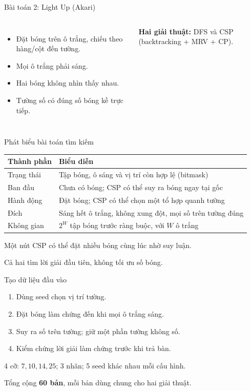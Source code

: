 \begin{frame}{Bài toán 2: Light Up (Akari)}
\begin{columns}[c,onlytextwidth]
\centering
{}\begin{itemize}
\item Đặt bóng trên ô trắng, chiếu theo hàng/cột đến tường.
\item Mọi ô trắng phải sáng.
\item Hai bóng không nhìn thấy nhau.
\item Tường số có đúng số bóng kề trực tiếp.
\end{itemize}\vspace{3mm}
\textbf{Hai giải thuật:} DFS và CSP (backtracking + MRV + CP).
\end{columns}
\end{frame}

\begin{frame}{Phát biểu bài toán tìm kiếm}
\small\begin{tabular}{@{}p{}p{}@{}}\toprule
Thành phần & Biểu diễn\\\midrule
Trạng thái & Tập bóng, ô sáng và vị trí còn hợp lệ (bitmask)\\
Ban đầu & Chưa có bóng; CSP có thể suy ra bóng ngay tại gốc\\
Hành động & Đặt bóng; CSP có thể chọn một tổ hợp quanh tường\\
Đích & Sáng hết ô trắng, không xung đột, mọi số trên tường đúng\\
Không gian & $2^W$ tập bóng trước ràng buộc, với $W$ ô trắng\\\bottomrule
\end{tabular}
\vspace{3mm}\par
Một nút CSP có thể đặt nhiều bóng cùng lúc nhờ suy luận.\par
Cả hai tìm lời giải đầu tiên, không tối ưu số bóng.
\end{frame}

\begin{frame}{Tạo dữ liệu đầu vào}
\begin{enumerate}
\item Dùng seed chọn vị trí tường.
\item Đặt bóng làm chứng đến khi mọi ô trắng sáng.
\item Suy ra số trên tường; giữ một phần tường không số.
\item Kiểm chứng lời giải làm chứng trước khi trả bàn.
\end{enumerate}
\vspace{3mm}\small
4 cỡ: $7,10,14,25$; 3 nhãn; 5 seed khác nhau mỗi cấu hình.\par
Tổng cộng \textbf{60 bản}, mỗi bản dùng chung cho hai giải thuật.
\end{frame}

